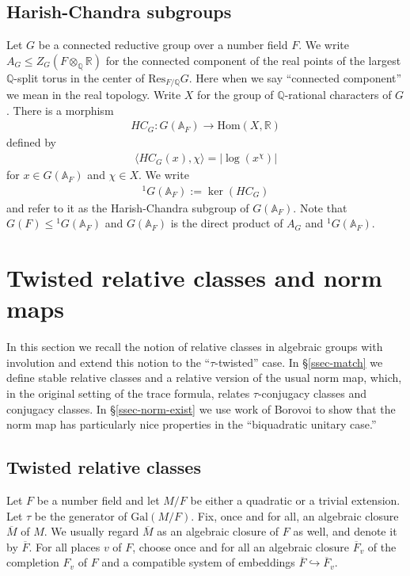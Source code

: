 \documentclass[12pt]{amsart}
\theoremstyle{remark}
\numberwithin{equation}{section}
\newcommand{\A}{\mathbb{A}}
\newcommand{\Gal}{\mathrm{Gal}}
\newcommand{\QQ}{\mathbb{Q}}
\newcommand{\lto}{\longrightarrow}
\newcommand{\RR}{\mathbb{R}}
\theoremstyle{definition}
\renewcommand{\bar}{\overline}
\numberwithin{equation}{subsection}
\begin{document}
\subsection{Harish-Chandra subgroups} \label{HC-subgroup}
Let $G$ be a connected reductive group over a number field $F$.  We write $A_G \leq Z_G(F \otimes_{\QQ} \RR)$  for the connected component of the real points of the largest $\QQ$-split torus in the center of $\mathrm{Res}_{F/\QQ}G$.  Here when we say ``connected component'' we mean in the real topology.  Write
$X$ for the group of $\QQ$-rational characters of $G$.  There is a morphism
\begin{align*}
HC_G:G(\A_F) \lto \mathrm{Hom}(X,\RR)
\end{align*}
defined by
\begin{align}
\langle HC_G(x),\chi\rangle =|\log(x^{\chi})|
\end{align}
for $x \in G(\A_F)$ and $\chi \in X$.  We write
\begin{align}
^{1}G(\A_F):=\ker(HC_G)
\end{align}
\index{$^{1}G(\A_F)$}and refer to it as the Harish-Chandra subgroup of $G(\A_F)$.  Note that $G(F) \leq {}^1G(\A_F)$ and
$G(\A_F)$ is the direct product of $A_G$ and $^{1}G(\A_F)$.

\section{Twisted relative classes and norm maps}
\label{sec-norm-maps}
In this section we recall the notion of relative classes in algebraic groups
with involution and extend this notion to the ``$\tau$-twisted'' case.  In \S \ref{ssec-match}
we
define stable relative classes and a relative version of the usual norm map,
which, in the original setting
of the trace formula, relates $\tau$-conjugacy
classes and conjugacy classes.  In \S \ref{ssec-norm-exist} we use
work of Borovoi to show that the norm map has particularly nice properties in the
``biquadratic unitary case.''

\subsection{Twisted relative classes}
\label{ssec-basic-notat}

Let $F$ be a number field and let $M/F$ be either a quadratic or a trivial
extension.  Let $\tau$ be the generator of $\Gal(M/F)$.
Fix, once and for all, an algebraic closure $\bar{M}$ of $M$.
We usually regard $\bar{M}$ as an algebraic closure of $F$
as well, and denote it by $\bar{F}$.  For all places $v$ of $F$,
choose once and for all an algebraic closure $\bar{F}_v$ of
the completion $F_v$ of $F$ and a compatible system of
embeddings $\bar{F} \hookrightarrow \bar{F}_v$.
\end{document}
